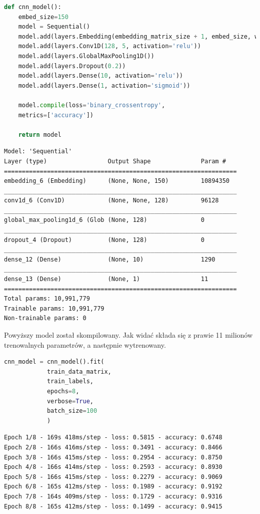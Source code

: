 \begin{lstlisting}[language=Python,frame=single, breaklines=true, caption=Model CNN.,label=code:cnn]
def cnn_model():
	embed_size=150
	model = Sequential()
	model.add(layers.Embedding(embedding_matrix_size + 1, embed_size, weights=[embedding_matrix]))
	model.add(layers.Conv1D(128, 5, activation='relu'))
	model.add(layers.GlobalMaxPooling1D())
	model.add(layers.Dropout(0.2))
	model.add(layers.Dense(10, activation='relu'))
	model.add(layers.Dense(1, activation='sigmoid'))
	
	model.compile(loss='binary_crossentropy',
	metrics=['accuracy'])
	
	return model
\end{lstlisting}

\begin{Verbatim}
Model: 'Sequential'
Layer (type)                 Output Shape              Param #   
=================================================================
embedding_6 (Embedding)      (None, None, 150)         10894350  
_________________________________________________________________
conv1d_6 (Conv1D)            (None, None, 128)         96128     
_________________________________________________________________
global_max_pooling1d_6 (Glob (None, 128)               0         
_________________________________________________________________
dropout_4 (Dropout)          (None, 128)               0         
_________________________________________________________________
dense_12 (Dense)             (None, 10)                1290      
_________________________________________________________________
dense_13 (Dense)             (None, 1)                 11        
=================================================================
Total params: 10,991,779
Trainable params: 10,991,779
Non-trainable params: 0
\end{Verbatim}

\noindent Powyższy model został skompilowany. Jak widać składa się z prawie 11 milionów trenowalnych parametrów, a następnie wytrenowany. 

\begin{lstlisting}[language=Python,frame=single, breaklines=true, caption=Trening modelu CNN.,label=code:cnn-trening]
cnn_model = cnn_model().fit(
			train_data_matrix,
			train_labels,
			epochs=8,
			verbose=True,
			batch_size=100
			)
\end{lstlisting}

\begin{Verbatim}
Epoch 1/8 - 169s 418ms/step - loss: 0.5815 - accuracy: 0.6748
Epoch 2/8 - 166s 416ms/step - loss: 0.3491 - accuracy: 0.8466
Epoch 3/8 - 166s 415ms/step - loss: 0.2954 - accuracy: 0.8750
Epoch 4/8 - 166s 414ms/step - loss: 0.2593 - accuracy: 0.8930
Epoch 5/8 - 166s 415ms/step - loss: 0.2279 - accuracy: 0.9069
Epoch 6/8 - 165s 412ms/step - loss: 0.1989 - accuracy: 0.9192
Epoch 7/8 - 164s 409ms/step - loss: 0.1729 - accuracy: 0.9316
Epoch 8/8 - 165s 412ms/step - loss: 0.1499 - accuracy: 0.9415
\end{Verbatim}

